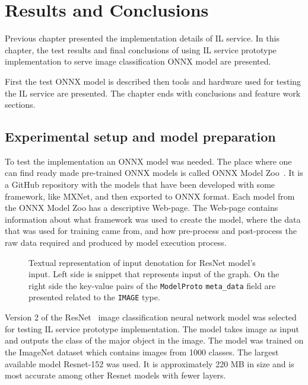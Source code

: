 \documentclass[english, 12pt, a4paper, elec, utf8, online]{aaltothesis}
\begin{document}
\section{Results and Conclusions}\label{chaper:results}
Previous chapter presented the implementation details of IL service. In this chapter, the test results and final conclusions of using IL service prototype implementation to serve image classification ONNX model are presented. 

First the test ONNX model is described then tools and hardware used for testing the IL service are presented. The chapter ends with conclusions and feature work sections.       

\subsection{Experimental setup and model preparation}     
To test the implementation an ONNX model was needed. The place where one can find ready made pre-trained ONNX models is called ONNX Model Zoo~\cite{onnx_model_zoo}. It is a GitHub repository with the models that have been developed with some framework, like MXNet, and then exported to ONNX format. Each model from the ONNX Model Zoo has a descriptive Web-page. The Web-page contains information about what framework was used to create the model, where the data that was used for training came from, and how pre-process and post-process the raw data required and produced by model execution process.

\begin{figure}[h!]
\centering
{}

\caption{Textual representation of input denotation for ResNet model's input. Left side is snippet that represents input of the graph. On the right side the key-value pairs of the \texttt{ModelProto} \texttt{meta\_data} field are presented related to the \texttt{IMAGE} type.}\label{fig:input_denotation}
\end{figure}

Version 2 of the ResNet~\cite{he2016deep} image classification neural network model was selected for testing IL service prototype implementation. The model takes image as input and outputs the class of the major object in the image. The model was trained on the ImageNet dataset which contains images from 1000 classes. The largest available model Resnet-152 was used. It is approximately 220 MB in size and is most accurate among other Resnet models with fewer layers. 
\end{document}
